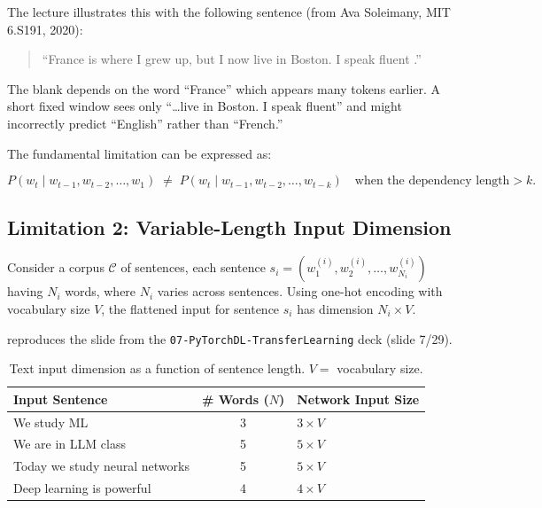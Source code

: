 \documentclass[12pt,a4paper]{article}
\begin{document}
The lecture illustrates this with the following sentence (from Ava Soleimany,
MIT 6.S191, 2020):

\begin{quote}
``France is where I grew up, but I now live in Boston.
 I speak fluent \underline{\hspace{1.5cm}}.''
\end{quote}

The blank depends on the word ``France'' which appears many tokens earlier.
A short fixed window sees only ``\ldots live in Boston. I speak fluent'' and
might incorrectly predict ``English'' rather than ``French.''

\vspace{0.5em}
The fundamental limitation can be expressed as:

\begin{equation}
  \label{eq:fixed_window}
  P(w_t \mid w_{t-1}, w_{t-2}, \ldots, w_1)
  \;\neq\;
  P(w_t \mid w_{t-1}, w_{t-2}, \ldots, w_{t-k})
  \quad \text{when the dependency length} > k.
\end{equation}

\subsection{Limitation 2: Variable-Length Input Dimension}
\label{subsec:variable_length}

Consider a corpus $\mathcal{C}$ of sentences, each sentence
$s_i = (w_1^{(i)}, w_2^{(i)}, \ldots, w_{N_i}^{(i)})$ having $N_i$ words,
where $N_i$ varies across sentences.  Using one-hot encoding with vocabulary
size $V$, the flattened input for sentence $s_i$ has dimension $N_i \times V$.

 reproduces the slide from the
\texttt{07-PyTorchDL-TransferLearning} deck (slide 7/29).

\begin{table}[ht]
  \centering
  \caption{Text input dimension as a function of sentence length.
           $V = $ vocabulary size.}
  \label{tab:varlen}
  \begin{tabular}{lcl}
    \toprule
    \textbf{Input Sentence} & \textbf{\# Words} ($N$) &
    \textbf{Network Input Size} \\
    \midrule
    We study ML               & 3 & $3 \times V$ \\
    We are in LLM class       & 5 & $5 \times V$ \\
    Today we study neural networks & 5 & $5 \times V$ \\
    Deep learning is powerful & 4 & $4 \times V$ \\
    \bottomrule
  \end{tabular}
\end{table}
\end{document}
